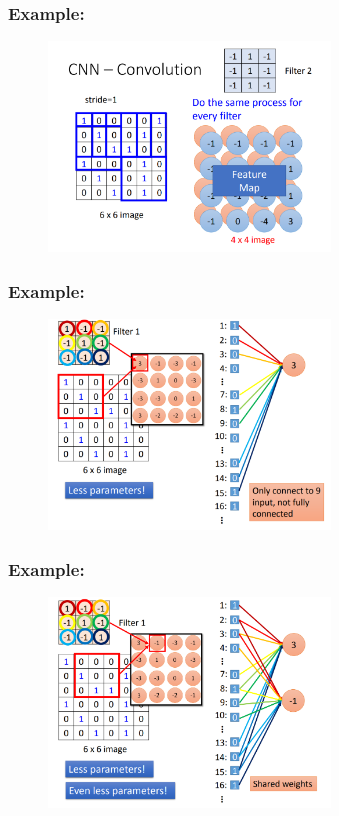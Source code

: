 \documentclass{beamer}
\begin{document}
    \begin{frame}
    \frametitle{Example: }
        \begin{figure}[H]
            \begin{center}
                \includegraphics[width=7.5cm]{ppt5}
            \end{center}
        \end{figure}
    \end{frame}
    \begin{frame}
    \frametitle{Example: }
        \begin{figure}[H]
            \begin{center}
                \includegraphics[width=7.5cm]{ppt6}
            \end{center}
        \end{figure}
    \end{frame}
    \begin{frame}
    \frametitle{Example: }
        \begin{figure}[H]
            \begin{center}
                \includegraphics[width=7.5cm]{ppt7}
            \end{center}
        \end{figure}
    \end{frame}
\end{document}
